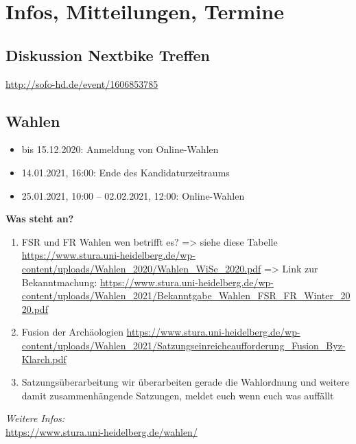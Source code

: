 \section{Infos, Mitteilungen, Termine}
\subsection{Diskussion Nextbike Treffen}
\url{http://sofo-hd.de/event/1606853785}

\subsection{Wahlen}
\begin{itemize}
    \item bis 15.12.2020: Anmeldung von Online-Wahlen
    \item 14.01.2021, 16:00: Ende des Kandidaturzeitraums
    \item 25.01.2021, 10:00 – 02.02.2021, 12:00: Online-Wahlen
\end{itemize}
\textbf{Was steht an?}
\begin{enumerate}
    \item FSR und FR Wahlen wen betrifft es? => siehe diese Tabelle
    \url{https://www.stura.uni-heidelberg.de/wp-content/uploads/Wahlen_2020/Wahlen_WiSe_2020.pdf}
    => Link zur Bekanntmachung:
    \url{https://www.stura.uni-heidelberg.de/wp-content/uploads/Wahlen_2021/Bekanntgabe_Wahlen_FSR_FR_Winter_2020.pdf}
    \item Fusion der Archäologien \url{https://www.stura.uni-heidelberg.de/wp-content/uploads/Wahlen_2021/Satzungseinreicheaufforderung_Fusion_Byz-Klarch.pdf}
    \item  Satzungsüberarbeitung wir überarbeiten gerade die Wahlordnung und weitere damit zusammenhängende Satzungen, meldet euch wenn euch was auffällt
\end{enumerate}
\emph{Weitere Infos:}\\
\url{https://www.stura.uni-heidelberg.de/wahlen/}